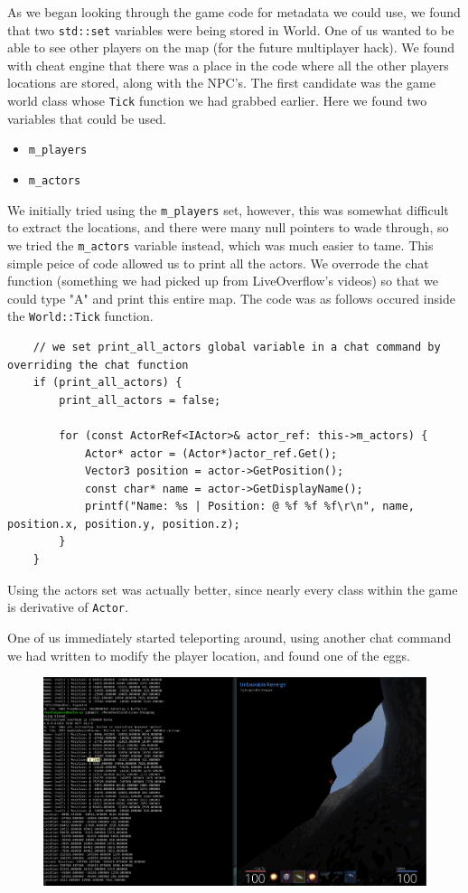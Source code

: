 \documentclass[11pt]{article}
\begin{document}
As we began looking through the game code for metadata we could use, we found that two \texttt{std::set} variables were being stored in World. One of us wanted to be able to see other players on the map (for the future multiplayer hack). We found with cheat engine that there was a place in the code where all the other players locations are stored, along with the NPC's. The first candidate was the game world class whose \texttt{Tick} function we had grabbed earlier. Here we found two variables that could be used.

\begin{itemize}
    \item \texttt{m\_players}
    \item \texttt{m\_actors}
\end{itemize}

We initially tried using the \texttt{m\_players} set, however, this was somewhat difficult to extract the locations, and there were many null pointers to wade through, so we tried the \texttt{m\_actors} variable instead, which was much easier to tame. This simple peice of code allowed us to print all the actors. We overrode the chat function (something we had picked up from LiveOverflow's videos) so that we could type "A" and print this entire map. The code was as follows occured inside the \texttt{World::Tick} function.

\begin{lstlisting}
    // we set print_all_actors global variable in a chat command by overriding the chat function
    if (print_all_actors) {
        print_all_actors = false;

        for (const ActorRef<IActor>& actor_ref: this->m_actors) {
            Actor* actor = (Actor*)actor_ref.Get();
            Vector3 position = actor->GetPosition();
            const char* name = actor->GetDisplayName();
            printf("Name: %s | Position: @ %f %f %f\r\n", name, position.x, position.y, position.z); 
        }
    }
\end{lstlisting}

Using the actors set was actually better, since nearly every class within the game is derivative of \texttt{Actor}.

One of us immediately started teleporting around, using another chat command we had written to modify the player location, and found one of the eggs.

\begin{figure}[H]
    \centering
    \includegraphics[width=1.00\linewidth]{golden_egg2.png}
\end{figure}
\end{document}
